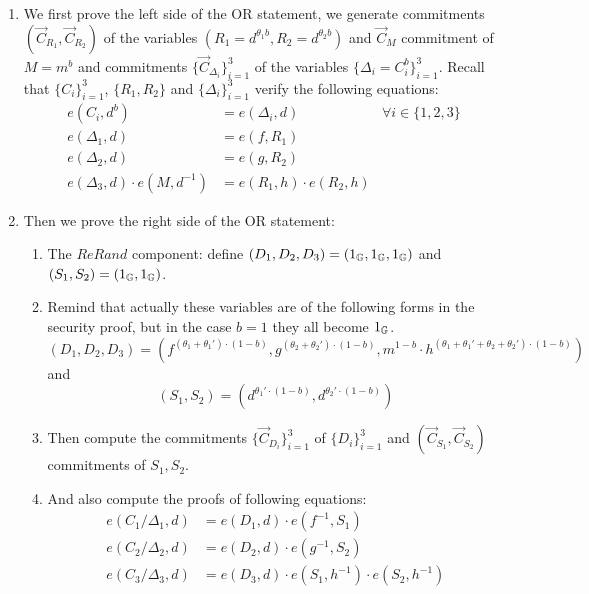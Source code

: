 \begin{description}
\begin{enumerate}
  \item We first prove the left side of the OR statement, we generate commitments $(\vec{C}_{R_1}, \vec{C}_{R_2})$ of the variables $(R_1 = d^{\theta_1b}, R_2 = d^{\theta_2b})$ and $\vec{C}_{M}$ commitment of $M = m^b$ and commitments $\{\vec{C}_{\Delta_i}\}_{i=1}^3$ of the variables $\{\Delta_i = C_i^b\}_{i=1}^3$. Recall that $\{C_i\}_{i=1}^3$, $\{R_1,R_2\}$ and $\{\Delta_i\}_{i=1}^3$ verify the following equations:
    \begin{align}
      e(C_i,\boxed{d^b}) &= e(\boxed{\Delta_i}, d)  &\forall i \in \{1,2,3\} \tag{2,3,4}\\
      e(\boxed{\Delta_1},d) &= e(f, \boxed{R_1}) \tag{5}\\
      e(\boxed{\Delta_2},d) &= e(g, \boxed{R_2}) \tag{6}\\
      e(\boxed{\Delta_3},d) \cdot e(\boxed{M},d^{-1}) &= e(\boxed{R_1}, h) \cdot e(\boxed{R_2},h) \tag{7}
    \end{align}



  \item Then we prove the right side of the OR statement:
    \begin{enumerate}  
    \item The $ReRand$ component: define $(D_1, D_2, D_3) = (1_{\mathbb{G}}, 1_{\mathbb{G}}, 1_{\mathbb{G}})$ and $(S_1,S_2) = (1_{\mathbb{G}}, 1_{\mathbb{G}})$.
    \item Remind that actually these variables are of the following forms in the security proof, but in the case $b=1$ they all become $1_{\mathbb{G}}$.
      $$(D_1, D_2, D_3) = (f^{(\theta_1+\theta_1')\cdot (1-b)},g^{(\theta_2+\theta_2')\cdot (1-b)},m^{1-b} \cdot h^{(\theta_1+\theta_1'+\theta_2+\theta_2')\cdot (1-b)})$$
      and $$(S_1, S_2) = (d^{\theta_1'\cdot (1-b)}, d^{\theta_2'\cdot (1-b)})$$
    \item Then compute the commitments $\{\vec{C}_{D_i}\}_{i=1}^3$ of $\{D_i\}_{i= 1}^3$ and $(\vec{C}_{S_1},\vec{C}_{S_2})$ commitments of $S_1,S_2$.
    \item And also compute the proofs of following equations:
      \begin{align}
        e(C_1/\boxed{\Delta_1}, d) &= e (\boxed{D_1},d) \cdot e(f^{-1}, \boxed{S_1}) \tag{8}\\
        e(C_2/\boxed{\Delta_2}, d) &= e (\boxed{D_2},d) \cdot e(g^{-1}, \boxed{S_2}) \tag{9}\\
        e(C_3/\boxed{\Delta_3}, d) &= e (\boxed{D_3},d) \cdot e(\boxed{S_1},h^{-1}) \cdot e(\boxed{S_2},h^{-1}) \tag{10}
      \end{align}


\end{enumerate}
\end{enumerate}
\end{description}
